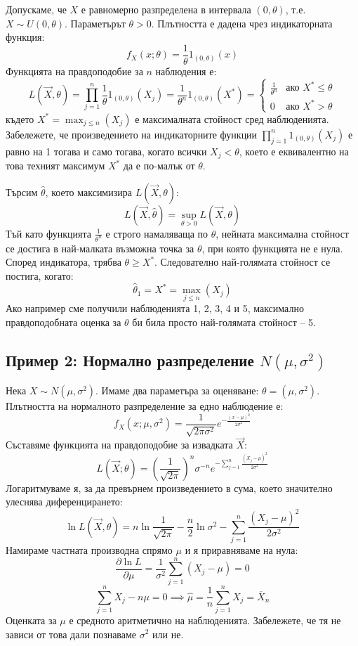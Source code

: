 \documentclass{article}
\begin{document}
Допускаме, че $X$ е равномерно разпределена в интервала $(0, \theta)$, т.е. $X \sim U(0, \theta)$. Параметърът $\theta > 0$. Плътността е дадена чрез индикаторната функция:
\[
    f_X(x; \theta) = \frac{1}{\theta} 1_{(0, \theta)}(x)
\]
Функцията на правдоподобие за $n$ наблюдения е:
\[
    L(\vec{X}, \theta) = \prod_{j=1}^{n} \frac{1}{\theta} 1_{(0, \theta)}(X_j) = \frac{1}{\theta^n} 1_{(0, \theta)}(X^*) = \begin{cases} \frac{1}{\theta^n} & \text{ако } X^* \le \theta \\ 0 & \text{ако } X^* > \theta \end{cases}
\]
където $X^* = \max_{j \le n}(X_j)$ е максималната стойност сред наблюденията. Забележете, че произведението на индикаторните функции $\prod_{j=1}^n 1_{(0, \theta)}(X_j)$ е равно на 1 тогава и само тогава, когато всички $X_j < \theta$, което е еквивалентно на това техният максимум $X^*$ да е по-малък от $\theta$.

Търсим $\hat{\theta}$, което максимизира $L(\vec{X}, \theta)$:
\[
    L(\vec{X}, \hat{\theta}) = \sup_{\theta > 0} L(\vec{X}, \theta)
\]
Тъй като функцията $\frac{1}{\theta^n}$ е строго намаляваща по $\theta$, нейната максимална стойност се достига в най-малката възможна точка за $\theta$, при която функцията не е нула. Според индикатора, трябва $\theta \ge X^*$. Следователно най-голямата стойност се постига, когато:
\[
    \hat{\theta}_1 = X^* = \max_{j \le n}(X_j)
\]
Ако например сме получили наблюденията 1, 2, 3, 4 и 5, максимално правдоподобната оценка за $\theta$ би била просто най-голямата стойност -- 5.

\subsection{Пример 2: Нормално разпределение $N(\mu, \sigma^2)$}

Нека $X \sim N(\mu, \sigma^2)$. Имаме два параметъра за оценяване: $\theta = (\mu, \sigma^2)$.
Плътността на нормалното разпределение за едно наблюдение е:
\[
    f_X(x; \mu, \sigma^2) = \frac{1}{\sqrt{2\pi\sigma^2}} e^{-\frac{(x - \mu)^2}{2\sigma^2}}
\]
Съставяме функцията на правдоподобие за извадката $\vec{X}$:
\[
    L(\vec{X}; \theta) = \left(\frac{1}{\sqrt{2\pi}}\right)^n \sigma^{-n} e^{-\sum_{j=1}^n \frac{(X_j - \mu)^2}{2\sigma^2}}
\]
Логаритмуваме я, за да превърнем произведението в сума, което значително улеснява диференцирането:
\[
    \ln L(\vec{X}, \theta) = n \ln \frac{1}{\sqrt{2\pi}} - \frac{n}{2} \ln \sigma^2 - \sum_{j=1}^n \frac{(X_j - \mu)^2}{2\sigma^2}
\]
Намираме частната производна спрямо $\mu$ и я приравняваме на нула:
\[
    \frac{\partial \ln L}{\partial \mu} = \frac{1}{\sigma^2} \sum_{j=1}^n (X_j - \mu) = 0 
\]
\[
    \sum_{j=1}^n X_j - n\mu = 0 \implies \hat{\mu} = \frac{1}{n} \sum_{j=1}^n X_j = \overline{X}_n
\]
Оценката за $\mu$ е средното аритметично на наблюденията. Забележете, че тя не зависи от това дали познаваме $\sigma^2$ или не.
\end{document}
